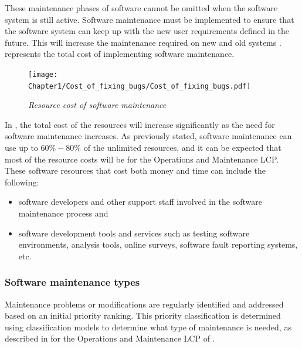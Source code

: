 These maintenance phases of software cannot be omitted when the software system is still active. Software maintenance must be implemented to ensure that the software system can keep up with the new user requirements defined in the future. This will increase the maintenance required on new and old systems \cite{Niu2018, Galster2019, Hasan2012}.  represents the total cost of implementing software maintenance.

\begin{figure}[!htb]
	\centering %
	\texttt{[image: Chapter1/Cost\_of\_fixing\_bugs/Cost\_of\_fixing\_bugs.pdf]}
	\caption[Resource cost of software maintenance]
	{\textit{Resource cost of software maintenance \cite{Ogheneovo2014}}}\label{fig:ch1_costsOfFixingBugs}
\end{figure}

In , the total cost of the resources will increase significantly as the need for software maintenance increases. As previously stated, software maintenance can use up to $60\%-80\%$ of the unlimited resources, and it can be expected that most of the resource costs will be for the Operations and Maintenance LCP. These software resources that cost both money and time can include the following:

\begin{itemize}
	\item software developers and other support staff involved in the software maintenance process and
	\item software development tools and services such as testing software environments, analysis tools, online surveys, software fault reporting systems, etc.
\end{itemize}

\subsubsection{Software maintenance types}

Maintenance problems or modifications are regularly identified and addressed based on an initial priority ranking. This priority classification is determined using classification models to determine what type of maintenance is needed, as described in  for the Operations and Maintenance LCP of  \cite{Tang2010, Ping2010}.

